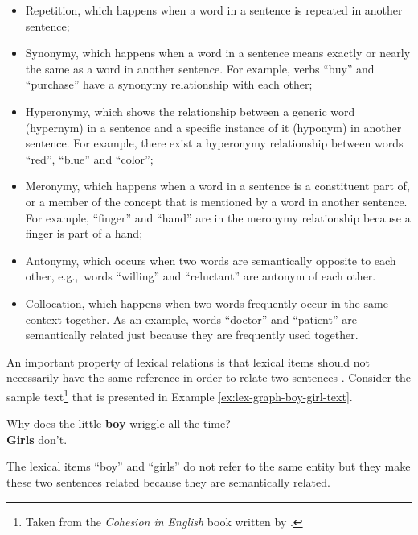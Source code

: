 \begin{itemize}

\item Repetition, which happens when a word in a sentence is repeated in another sentence; 


\item Synonymy, which happens when a word in a sentence means exactly or nearly the same as a word in another sentence. 
For example, verbs ``buy'' and ``purchase'' have a synonymy relationship with each other;  

\item Hyperonymy, which shows the relationship between a generic word (hypernym) in a sentence and a specific instance of it (hyponym) in another sentence. 
For example, there exist a hyperonymy relationship between words ``red'', ``blue'' and ``color'';

\item Meronymy, which happens when a word in a sentence is a constituent part of, or a member of the concept that is mentioned by a word in another sentence. 
For example, ``finger'' and ``hand'' are in the meronymy relationship because a finger is part of a hand;

\item Antonymy, which occurs when two words are semantically opposite to each other, e.g.,\ words ``willing'' and  ``reluctant'' are antonym of each other. 

\item Collocation, which happens when two words frequently occur in the same context together. As an example, words ``doctor'' and ``patient'' are semantically related just because they are frequently used together.

\end{itemize}

An important property of lexical relations is that lexical items should not necessarily have the same reference in order to relate two sentences \cite{halliday76}.
Consider the sample text\footnote{Taken from the \emph{Cohesion in English} book written by .} that is presented in Example \ref{ex:lex-graph-boy-girl-text}.

\begin{examples}
  \label{ex:lex-graph-boy-girl-text}
  Why does the little \textbf{boy} wriggle all the time? \\
  \textbf{Girls} don't.
\end{examples}

The lexical items ``boy'' and ``girls'' do not refer to the same entity but they make these two sentences related because they are semantically related.  

